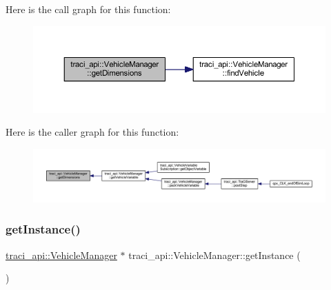 Here is the call graph for this function\+:\nopagebreak
\begin{figure}[H]
\begin{center}
\leavevmode
\includegraphics[width=350pt]{classtraci__api_1_1_vehicle_manager_a626f8aea7366479ec9bdd49f58f5b530_cgraph}
\end{center}
\end{figure}
Here is the caller graph for this function\+:\nopagebreak
\begin{figure}[H]
\begin{center}
\leavevmode
\includegraphics[width=350pt]{classtraci__api_1_1_vehicle_manager_a626f8aea7366479ec9bdd49f58f5b530_icgraph}
\end{center}
\end{figure}
\mbox{\label{classtraci__api_1_1_vehicle_manager_a2f2e2b5647eda9af94094da62788cd2e}} 
\subsubsection{\texorpdfstring{get\+Instance()}{getInstance()}}
{\footnotesize\ttfamily \hyperlink{classtraci__api_1_1_vehicle_manager}{traci\+\_\+api\+::\+Vehicle\+Manager} $\ast$ traci\+\_\+api\+::\+Vehicle\+Manager\+::get\+Instance (\begin{DoxyParamCaption}{ }\end{DoxyParamCaption})\hspace{0.3cm}{\ttfamily [static]}}

